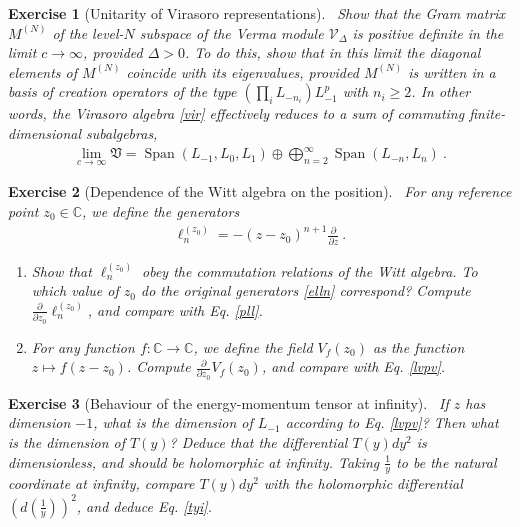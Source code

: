 \documentclass[12pt, a4paper, notitlepage, twoside]{report}
\numberwithin{equation}{section}
\theoremstyle{break}
\newtheorem{exo}{Exercise}[chapter]
\begin{document}
\begin{exo}[Unitarity of Virasoro representations]
~\label{exoun}
Show that the Gram matrix $M^{(N)}$ of the level-$N$ subspace of the Verma module $\mathcal{V}_\Delta$ is positive definite in the limit $c\to \infty$, provided  $\Delta >0$. 
To do this, show that in this limit the diagonal elements of $M^{(N)}$ coincide with its eigenvalues, provided $M^{(N)}$ is written in a basis of creation operators of the type $(\prod_i L_{-n_i}) L_{-1}^p$ with $n_i\geq 2$.
In other words, the Virasoro algebra \eqref{vir} effectively reduces to a sum of commuting finite-dimensional subalgebras, 
\begin{align}
 \underset{c\to \infty}{\lim} \mathfrak{V}  
=  \operatorname{Span}(L_{-1},L_0,L_1) \oplus \bigoplus_{n=2}^\infty \operatorname{Span} (L_{-n}, L_n)\ .
\end{align}
\end{exo}

\begin{exo}[Dependence of the Witt algebra on the position]
 ~\label{exowitt}
For any reference point $z_0\in\mathbb{C}$, we define the generators
\begin{align}
 \ell_n^{(z_0)} = -(z-z_0)^{n+1}{\frac{\partial}{\partial z}}\ .
\end{align}
\begin{enumerate}
 \item Show that $\ell_n^{(z_0)}$ obey the commutation relations of the Witt algebra. To which value of $z_0$ do the original generators \eqref{elln} correspond?
Compute $\frac{\partial}{\partial z_0} \ell_n^{(z_0)}$, and compare with Eq. \eqref{pll}.
\item For any function $f:\mathbb{C}\to \mathbb{C}$, we define the field $V_f(z_0)$ as the function $z\mapsto f(z-z_0)$. Compute $\frac{\partial}{\partial z_0} V_f(z_0)$, and compare with Eq. \eqref{lvpv}.
\end{enumerate}
\end{exo}

\begin{exo}[Behaviour of the energy-momentum tensor at infinity]
 ~\label{exoti}
 If $z$ has dimension $-1$, what is the dimension of $L_{-1}$ according to Eq. \eqref{lvpv}? Then what is the dimension of $T(y)$? Deduce that the differential $T(y)dy^2$ is dimensionless, and should be holomorphic at infinity. Taking $\frac{1}{y}$ to be the natural coordinate at infinity, compare $T(y)dy^2$ with the holomorphic differential $\left(d(\frac{1}{y})\right)^2$, and deduce Eq. \eqref{tyi}.
\end{exo}
\end{document}
